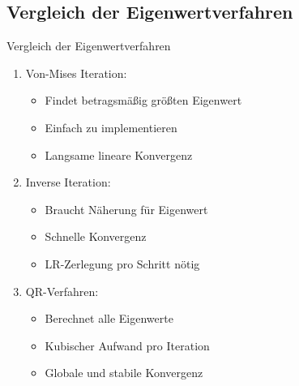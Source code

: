 \columnbreak
\raggedcolumns

\subsection{Vergleich der Eigenwertverfahren}

\begin{concept}{Vergleich der Eigenwertverfahren}
\begin{enumerate}
    \item Von-Mises Iteration:
    \begin{itemize}
        \item Findet betragsmäßig größten Eigenwert
        \item Einfach zu implementieren
        \item Langsame lineare Konvergenz
    \end{itemize}
    
    \item Inverse Iteration:
    \begin{itemize}
        \item Braucht Näherung für Eigenwert
        \item Schnelle Konvergenz
        \item LR-Zerlegung pro Schritt nötig
    \end{itemize}
    
    \item QR-Verfahren:
    \begin{itemize}
        \item Berechnet alle Eigenwerte 
        \item Kubischer Aufwand pro Iteration
        \item Globale und stabile Konvergenz
    \end{itemize}
\end{enumerate}
\end{concept}

